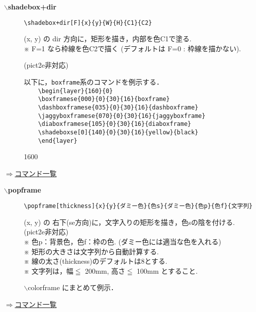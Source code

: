 \documentclass[a4j,12pt,dvipdfmx]{ujarticle}
\newcommand{\bs}{$\backslash$}
\newenvironment{cmd}[2]{%
\hypertarget{#2}{}
\begin{center}{\bf\large #1}\end{center}
\begin{description}
}{
\end{description}
\begin{flushright} \hyperlink{functionlist}{$\Rightarrow$コマンド一覧}\end{flushright}
}
\newcommand{\itemketj}[1]{
\item[\Ltab{15mm}{#1}]
}
\newcommand{\Chuu}[1][6.7mm]{%
\Ltab{#1}{}※ %
}
\begin{document}
\begin{cmd}{\bs shadebox+dir}{shadebox}
\itemketj{使用法}\verb|\shadebox+dir[F]{x}{y}{W}{H}{C1}{C2}|
\itemketj{説明}(x, y) の dir 方向に，矩形を描き，内部を色C1で塗る.\\
\Chuu F=1 なら枠線を色C2で描く (デフォルトは F=0 : 枠線を描かない).

\qquad(pict2e非対応)%

\vspace{\baselineskip}
以下に，\verb|boxframe|系のコマンドを例示する．\\
\verb|    \begin{layer}{160}{0}|\\
\verb|    \boxframese{000}{0}{30}{16}{boxframe}|\\
\verb|    \dashboxframese{035}{0}{30}{16}{dashboxframe}|\\
\verb|    \jaggyboxframese{070}{0}{30}{16}{jaggyboxframe}|\\
\verb|    \diaboxframese{105}{0}{30}{16}{diaboxframe}|\\
\verb|    \shadeboxse[0]{140}{0}{30}{16}{yellow}{black}|\\
\verb|    \end{layer}|

\vspace{\baselineskip}
\begin{layer}{160}{0}
\end{layer}

\vspace{15mm}
\end{cmd}
\begin{cmd}{\bs popframe}{popframe}
\itemketj{使用法}\verb|\popframe[thickness]{x}{y}{ダミー色}{色s}{ダミー色}{色p}{色f}{文字列}|
\itemketj{説明}(x, y) の 右下(se方向)に，文字入りの矩形を描き，色sの陰を付ける. \\
\qquad(pict2e非対応)\\%
\Chuu 色p：背景色，色f：枠の色.
(ダミー色には適当な色を入れる)\\
\Chuu 矩形の大きさは文字列から自動計算する.\\
\Chuu 線の太さ(thickness)のデフォルトは8とする.\\
\Chuu 文字列は，幅$\leqq$ 200mm, 高さ$\leqq$ 100mm とすること.
\itemketj{例}{\bs colorframe} にまとめて例示．
\end{cmd}
\end{document}
